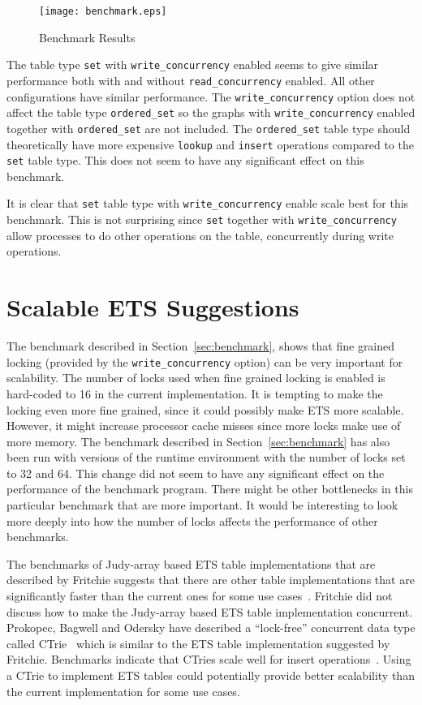 \documentclass[aps,pre,preprint,nofootinbib]{revtex4}
\begin{document}
\begin{figure}[htb]
\centering
\texttt{[image: benchmark.eps]}
\caption{Benchmark Results}
\label{fig:benchmark_results}
\end{figure}

The table type \verb|set| with \verb|write_concurrency| enabled seems to give similar performance both with and without \verb|read_concurrency| enabled.
All other configurations have similar performance.
The \verb|write_concurrency| option does not affect the table type \verb|ordered_set| so the graphs with  \verb|write_concurrency| enabled together with \verb|ordered_set| are not included.
The \verb|ordered_set| table type should theoretically have more expensive \verb|lookup| and \verb|insert| operations compared to the \verb|set| table type.
This does not seem to have any significant effect on this benchmark.

It is clear that \verb|set| table type with \verb|write_concurrency| enable scale best for this benchmark.
This is not surprising since \verb|set| together with \verb|write_concurrency| allow processes to do other operations on the table, concurrently during write operations. 

\section{Scalable ETS Suggestions}

The benchmark described in Section~\ref{sec:benchmark}, shows that fine grained locking (provided by the \verb|write_concurrency| option) can be very important for scalability.
The number of locks used when fine grained locking is enabled is hard-coded to 16 in the current implementation.
It is tempting to make the locking even more fine grained, since it could possibly make ETS more scalable.
However, it might increase processor cache misses since more locks make use of more memory.
The benchmark described in Section~\ref{sec:benchmark} has also been run with versions of the runtime environment with the number of locks set to 32 and 64.
This change did not seem to have any significant effect on the performance of the benchmark program.
There might be other bottlenecks in this particular benchmark that are more important.
It would be interesting to look more deeply into how the number of locks affects the performance of other benchmarks.

The benchmarks of Judy-array based ETS table implementations that are described by Fritchie suggests that there are other table implementations that are significantly faster than the current ones for some use cases~\cite{ScottEtsJudy}.
Fritchie did not discuss how to make the Judy-array based ETS table implementation concurrent.
Prokopec, Bagwell and Odersky have described a ``lock-free'' concurrent data type called CTrie~\cite{ProkopecCTrie} which is similar to the ETS table implementation suggested by Fritchie.
Benchmarks indicate that CTries scale well for insert operations~\cite{ProkopecCTrie}.
Using a CTrie to implement ETS tables could potentially provide better scalability than the current implementation for some use cases.
\end{document}
